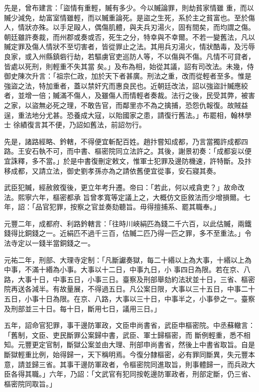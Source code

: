 \begin{pinyinscope}
 先是，曾布建言：「盜情有重輕，贓有多少。今以贓論罪，則劫貧家情雖
 重，而以贓少減免，劫富室情雖輕，而以贓重論死。是盜之生死，系於主之貧富也。至於傷人，情狀亦殊。以手足毆人，偶傷肌體，與夫兵刃湯火，固有間矣，而均謂之傷。朝廷雖許奏裁，而州郡或奏或否，死生之分，特幸與不幸爾。不若一變舊法，凡以贓定罪及傷人情狀不至切害者，皆從罪止之法。其用兵刃湯火，情狀酷毒，及污辱良家，或入州縣鎮砦行劫，若驅虜官吏巡防人等，不以傷與不傷。凡情不可貸者，皆處以死刑，則輕重不失其當
 矣。」及布為相，始從其議，詔有司改法。未幾，侍御史陳次升言：「祖宗仁政，加於天下者甚廣。刑法之重，改而從輕者至多。惟是強盜之法，特加重者，蓋以禁奸宄而惠良民也。近朝廷改法，詔以強盜計贓應絞者，並增一倍；贓滿不傷人，及雖傷人而情輕者奏裁。法行之後，民受其弊，被害之家，以盜無必死之理，不敢告官，而鄰里亦不為之擒捕，恐怨仇報復。故賊益逞，重法地分尤甚。恐養成大寇，以貽國家之患，請復行舊法。」布罷相，翰林學士
 徐績復言其不便，乃詔如舊法，前詔勿行。



 先是，諸路經略、鈐轄，不得便宜斬配百姓。趙抃嘗知成都，乃言當獨許成都四路。王安石執不可，而中書、樞密院同立法許之。其後，謝景初奏：「成都妄以便宜誅釋，多不當。」於是中書復刪定敕文，惟軍士犯罪及邊防機速，許特斷。及抃移成都，又請立法，御史劉孝孫亦為之請依舊便宜從事，安石寢其奏。



 武臣犯贓，經赦敘復後，更立年考升遷。帝曰：「若此，何以戒貪吏？」故命改法。熙寧六年，樞密都承
 旨曾孝寬等定議上之，大概仿文臣敘法而少增損爾。七年，詔：「品官犯罪，按察之官並奏劾聽旨。毋得擅捕系、罷其職奉。」



 元豐二年，成都府、利路鈐轄言：「往時川峽絹匹為錢二千六百，以此估贓，兩鐵錢得比銅錢之一。近絹匹不過千三百，估贓二匹乃得一匹之罪，多不至重法。」令法寺定以一錢半當銅錢之一。



 元祐二年，刑部、大理寺定制：「凡斷讞奏獄，每二十緡以上為大事，十緡以上為中事，不滿十緡為小事。大事以十二日，中事九日，小
 事四日為限。若在京、八路，大事十日，中事五日，小事三日。臺察及刑部舉劾約法狀並十日，三省、樞密院再送各減半。有故量展，不得過五日。凡公案日限，大事以三十五日，中事二十五日，小事十日為限。在京、八路，大事以三十日，中事半之，小事參之一。臺察及刑部並三十日。每十日，斷用七日，議用三日。」



 五年，詔命官犯罪，事干邊防軍政，文臣申尚書省，武臣申樞密院。中丞蘇轍言：「舊制，文臣、吏民斷罪公案歸中書，武臣、軍士歸樞密，而
 斷例輕重，悉不相知。元豐更定官制，斷獄公案並由大理、刑部申尚書省，然後上中書省取旨。自是斷獄輕重比例，始得歸一，天下稱明焉。今復分隸樞密，必有罪同斷異，失元豐本意，請並歸三省。其事干邊防軍政者，令樞密院同進取旨，則事體歸一，而兵政大臣各得其職。」六年，乃詔：「文武官有犯同按乾邊防軍政者，刑部定斷，仍三省、樞密院同取旨。」




\end{pinyinscope}
